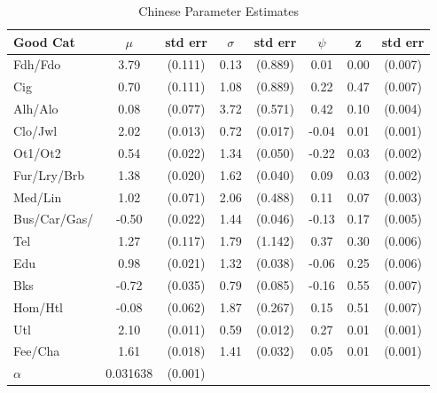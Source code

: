 \documentclass[11pt]{article}
\begin{document}
\begin{CJK}{UTF8}{gbsn}
\begin{table}[!ht]
    \centering
	\begin{tabular}{lccccccc}
		\hline\hline
		Good Cat & $\mu$ & std err      & $\sigma$ & std err  & $\psi$ & z & std err\\
		\hline 
		Fdh/Fdo        & 3.79  & (0.111) & 0.13 & (0.889) & 0.01  & 0.00 & (0.007)\\
		Cig            & 0.70  & (0.111) & 1.08 & (0.889) & 0.22  & 0.47 & (0.007)\\
		Alh/Alo        & 0.08  & (0.077) & 3.72 & (0.571) & 0.42  & 0.10 & (0.004)\\
		Clo/Jwl        & 2.02  & (0.013) & 0.72 & (0.017) & -0.04 & 0.01 & (0.001)\\
		Ot1/Ot2        & 0.54  & (0.022) & 1.34 & (0.050) & -0.22 & 0.03 & (0.002)\\
		Fur/Lry/Brb    & 1.38  & (0.020) & 1.62 & (0.040) & 0.09  & 0.03 & (0.002)\\
		Med/Lin        & 1.02  & (0.071) & 2.06 & (0.488) & 0.11  & 0.07 & (0.003)\\
		Bus/Car/Gas/\* & -0.50 & (0.022) & 1.44 & (0.046) & -0.13 & 0.17 & (0.005)\\
		Tel            & 1.27  & (0.117) & 1.79 & (1.142) & 0.37  & 0.30 & (0.006)\\
		Edu            & 0.98  & (0.021) & 1.32 & (0.038) & -0.06 & 0.25 & (0.006)\\
		Bks            & -0.72 & (0.035) & 0.79 & (0.085) & -0.16 & 0.55 & (0.007)\\
		Hom/Htl        & -0.08 & (0.062) & 1.87 & (0.267) & 0.15  & 0.51 & (0.007)\\
		Utl            & 2.10  & (0.011) & 0.59 & (0.012) & 0.27  & 0.01 & (0.001)\\
		Fee/Cha        & 1.61  & (0.018) & 1.41 & (0.032) & 0.05  & 0.01 & (0.001)\\
		\hline
		$\alpha$ & 0.031638 & (0.001) & & & & \\
		\hline
	\end{tabular}
     	\linebreak
    \caption{Chinese Parameter Estimates}
    \label{tab:chnparest}
\end{table}

\end{CJK}
\end{document}
